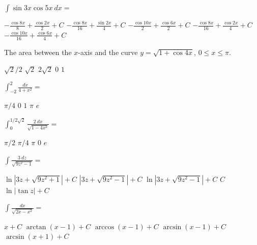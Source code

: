 \begin{questions}
\question[2] $\int \sin 3x \cos 5x\ dx = $

    \begin{oneparchoices}
    \choice $-\frac{\cos 8x}{8} + \frac{\cos 2x}{2} + C$
    \choice $-\frac{\cos 8x}{16} + \frac{\sin 2x}{4} + C$
    \choice $-\frac{\cos 10x}{2} + \frac{\cos 6x}{2} + C$
    \CorrectChoice $-\frac{\cos 8x}{16} + \frac{\cos 2x}{4} + C$
    \choice $-\frac{\cos 10x}{16} + \frac{\cos 6x}{4} + C$
    \end{oneparchoices}

\question[2] The area between the $x$-axis and the curve $y = \sqrt{1
    + \cos 4x}$, $0 \le x \le \pi$.

    \begin{oneparchoices}
    \choice $\sqrt{2}/2$
    \choice $\sqrt{2}$
    \CorrectChoice $2\sqrt{2}$
    \choice $0$
    \choice $1$
    \end{oneparchoices}

\question[2] $\int_{-2}^2 \frac{dx}{4 + x^2} = $

    \begin{oneparchoices}
    \CorrectChoice $\pi/4$
    \choice $0$
    \choice $1$
    \choice $\pi$
    \choice $e$
    \end{oneparchoices}

\question[2] $\int_0^{1/2\sqrt{2}} \frac{2\ dx}{\sqrt{1 - 4x^2}} = $

    \begin{oneparchoices}
    \choice $\pi/2$
    \CorrectChoice $\pi/4$
    \choice $\pi$
    \choice $0$
    \choice $e$
    \end{oneparchoices}

\question[2] $\int \frac{3\ dz}{\sqrt{9z^2 - 1}} = $ 

    \begin{oneparchoices}
    \choice $\ln|3z + \sqrt{9z^2 + 1}| + C$
    \choice $|3z + \sqrt{9z^2 - 1}| + C$
    \CorrectChoice $\ln|3z + \sqrt{9z^2 - 1}| + C$
    \choice $C$
    \choice $\ln|\tan z| + C$
    \end{oneparchoices}

\question[2] $\int \frac{dx}{\sqrt{2x - x^2}} = $

    \begin{oneparchoices}
    \choice  $x + C$
    \choice  $\arctan(x - 1) + C$
    \choice  $\arccos(x - 1) + C$
    \CorrectChoice $\arcsin(x - 1) + C$
    \choice  $\arcsin(x + 1) + C$
    \end{oneparchoices}


\end{questions}
